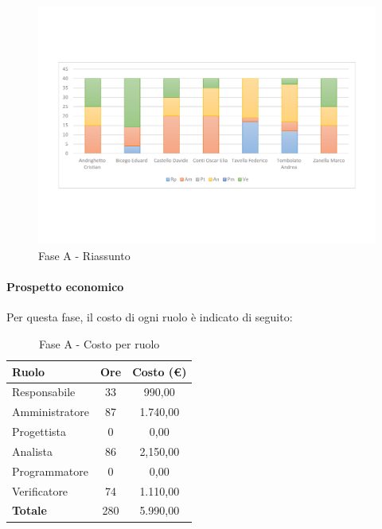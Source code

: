 \documentclass[../PianoProgetto.tex]{subfiles}
\begin{document}
	\begin{figure}[!h]
		\centering
		\includegraphics[width=\textwidth , trim=2cm 5cm 2cm 5cm]{grafici/A/A-ore-persona}
			\caption{Fase A - Riassunto}
		\label{fig:BarChart-faseA_ore}
	\end{figure}	
	
\newpage
	\vfill	
	\paragraph{Prospetto economico}
					Per questa fase\g , il costo di ogni ruolo è indicato di seguito:
	
	\begin{table}[h]
		\centering
		\begin{tabular}{l * {2}{c}}
			\toprule
			\textbf{Ruolo} & \textbf{Ore} & \textbf{Costo (\euro{})} \\
			\midrule
			Responsabile &	33 &  990,00 \\
			Amministratore & 87 &  1.740,00 \\
			Progettista & 0 & 0,00 \\
			Analista & 86 & 2,150,00 \\
			Programmatore & 0 & 0,00 \\
			Verificatore & 74 & 1.110,00 \\
			\midrule		
			\textbf{Totale} & 280 & 5.990,00 \\
			\bottomrule	
		\end{tabular}
		\caption{Fase A - Costo per ruolo}
		\label{tab:faseA_costo}
	\end{table}
\end{document}
